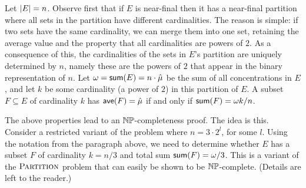 Let ${|E|} = n$. Observe first that if $E$ is near-final then it has a
near-final partition where all sets in the partition have different cardinalities.
The reason is simple: if two sets have the same cardinality, we can merge them into
one set, retaining the average value and the property that all cardinalities are powers of $2$.
As a consequence of this, the cardinalities of the sets in $E$'s partition are
uniquely determined by $n$, namely these are the powers of $2$ that appear in the binary
representation of $n$. Let $\omega = {\textsf{sum}}(E) = n\cdot{\hat{\mu}}$
be the sum of all concentrations in $E$, and let
$k$ be some cardinality (a power of $2$) in this partition of $E$. 
A subset $F\subseteq E$ of cardinality $k$ has ${\textsf{ave}}(F) = {\hat{\mu}}$ if and only if
${\textsf{sum}}(F) = \omega k/n$. 

The above properties lead to an ${\mathbb{NP}}$-completeness proof.
The idea is this. Consider a restricted variant of the problem where
$n = 3\cdot 2^l$, for some $l$. Using the notation from the paragraph above, we need to
determine whether $E$ has a subset $F$ of cardinality $k = n/3$ and
total sum ${\textsf{sum}}(F) = \omega/3$. This is a variant of the ${\textsc{Partition}}$
problem that can easily be shown to be ${\mathbb{NP}}$-complete. (Details are left to the reader.)









